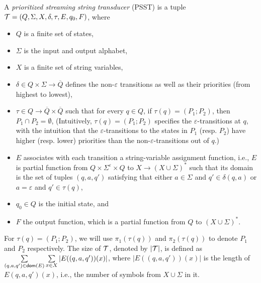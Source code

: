 \begin{definition}
A \emph{prioritized streaming string transducer} (PSST) is a tuple $\mathcal{T} = (Q, \Sigma, X, \delta, \tau, E, q_0, F)$, where 
\begin{itemize}
\item $Q$ is a finite set of states, 
\item $\Sigma$ is the input and output alphabet, 
\item $X$ is a finite set of string variables, 
\item $\delta \in Q \times \Sigma \rightarrow \overline{Q}$ defines the non-$\varepsilon$ transitions as well as their priorities (from highest to lowest),
% 
\item $\tau \in Q \rightarrow \overline{Q} \times \overline{Q}$ such that for every $q \in Q$, if $\tau(q) = (P_1; P_2)$, then $P_1 \cap P_2 = \emptyset$, (Intuitively, $\tau(q)=(P_1; P_2)$ specifies the $\varepsilon$-transitions at $q$, with the intuition that the $\varepsilon$-transitions to the states in $P_1$ (resp. $P_2$) have higher (resp. lower) priorities than the non-$\varepsilon$-transitions out of $q$.)
\item $E$ associates with each transition a string-variable assignment function, i.e., $E$ is partial function from $Q \times \Sigma^\varepsilon \times
  Q$ to $X \rightarrow (X \cup \Sigma)^{\ast}$ such that its domain is the set of tuples $(q, a, q')$ satisfying that either $a \in \Sigma$ and $q' \in \delta(q, a)$ or $a = \varepsilon$ and $q' \in \tau(q)$,
\item  $q_0 \in Q$ is the initial state, and
\item  $F$ the output function, which is a partial function from $Q$ to $(X \cup \Sigma)^{\ast}$.
\end{itemize}
\end{definition}
For $\tau(q)=(P_1; P_2)$, we will use $\pi_1(\tau(q))$ and $\pi_2(\tau(q))$ to denote $P_1$ and $P_2$ respectively.  
The size of $\mathcal{T}$, denoted by $|\mathcal{T}|$, is defined as $\sum \limits_{(q, a, q') \in \mathsf{dom}(E)} \sum \limits_{x \in X} |E((q, a, q'))(x)|$, where $|E((q, a, q'))(x)|$ is the length of $E(q, a, q')(x)$, i.e., the number of symbols from $X \cup \Sigma$ in it.

